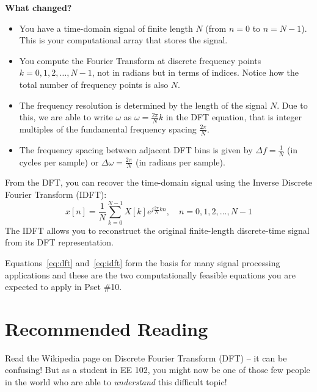 \textbf{What changed?}
\begin{itemize}
    \item You have a time-domain signal of finite length \( N \) (from \( n = 0 \) to \( n = N-1 \)). This is your computational array that stores the signal. 
    \item You compute the Fourier Transform at discrete frequency points \( k = 0, 1, 2, \ldots, N-1 \), not in radians but in terms of indices. Notice how the total number of frequency points is also \( N \).
    \item The frequency resolution is determined by the length of the signal \( N \). Due to this, we are able to write $\omega$ as $\omega = \frac{2\pi}{N} k$ in the DFT equation, that is integer multiples of the fundamental frequency spacing \( \frac{2\pi}{N} \).
    \item The frequency spacing between adjacent DFT bins is given by \( \Delta f = \frac{1}{N} \) (in cycles per sample) or \( \Delta \omega = \frac{2\pi}{N} \) (in radians per sample).
\end{itemize}

From the DFT, you can recover the time-domain signal using the Inverse Discrete Fourier Transform (IDFT):
\begin{equation}
    \label{eq:idft}
x[n] = \frac{1}{N} \sum_{k=0}^{N-1} X[k] e^{j \frac{2\pi}{N} k n}, \quad n = 0, 1, 2, \ldots, N-1
\end{equation}
The IDFT allows you to reconstruct the original finite-length discrete-time signal from its DFT representation.

Equations~\eqref{eq:dft} and~\eqref{eq:idft} form the basis for many signal processing applications and these are the two computationally feasible equations you are expected to apply in Pset \#10.

\section{Recommended Reading}
Read the Wikipedia page on Discrete Fourier Transform (DFT) -- it can be confusing! But as a student in EE 102, you might now be one of those few people in the world who are able to \emph{understand} this difficult topic!
